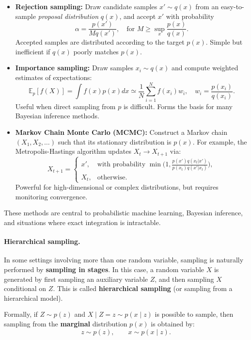 \begin{itemize}
    \item \textbf{Rejection sampling:}  
    Draw candidate samples $x' \sim q(x)$ from an easy-to-sample \emph{proposal distribution} $q(x)$, and accept $x'$ with probability
    \[
        \alpha = \frac{p(x')}{M q(x')}, \quad \text{for } M \ge \sup_x \frac{p(x)}{q(x)}.
    \]
    Accepted samples are distributed according to the target $p(x)$. Simple but inefficient if $q(x)$ poorly matches $p(x)$.

    \item \textbf{Importance sampling:}  
    Draw samples $x_i \sim q(x)$ and compute weighted estimates of expectations:
    \[
        \mathbb{E}_p[f(X)] = \int f(x) p(x) dx \simeq \frac{1}{N} \sum_{i=1}^N f(x_i) w_i, \quad w_i = \frac{p(x_i)}{q(x_i)}.
    \]
    Useful when direct sampling from $p$ is difficult. Forms the basis for many Bayesian inference methods.

    \item \textbf{Markov Chain Monte Carlo (MCMC):}  
    Construct a Markov chain $(X_1, X_2, \dots)$ such that its stationary distribution is $p(x)$. For example, the Metropolis-Hastings algorithm updates $X_t \to X_{t+1}$ via:
    \[
        X_{t+1} = 
        \begin{cases}
            x', & \text{with probability } \min\Big(1, \frac{p(x') q(x_t|x')}{p(x_t) q(x'|x_t)}\Big),\\
            X_t, & \text{otherwise}.
        \end{cases}
    \]
    Powerful for high-dimensional or complex distributions, but requires monitoring convergence.
\end{itemize}

These methods are central to probabilistic machine learning, Bayesian inference, and situations where exact integration is intractable.

\paragraph{Hierarchical sampling.}

In some settings involving more than one random variable, sampling is naturally performed by
\textbf{sampling in stages}.   In this case, a random variable $X$ is generated by first sampling an auxiliary variable
$Z$, and then sampling $X$ conditional on $Z$.  
This is called \textbf{hierarchical sampling} (or sampling from a hierarchical
model).

Formally, if $Z \sim p(z)$ and $X \mid Z=z \sim p(x \mid z)$ is possible to sample, then sampling from the \textbf{marginal} distribution $p(x)$ is obtained by:
\[
z \sim p(z), \qquad x \sim p(x \mid z).
\]


